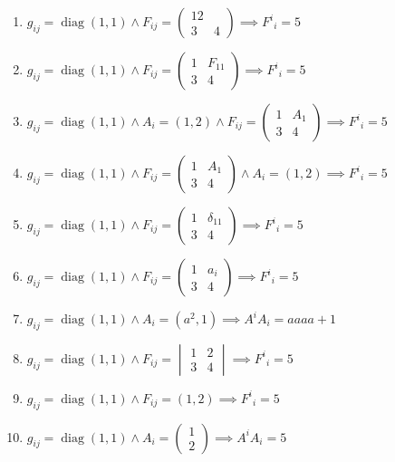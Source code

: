 \documentclass[11pt,a4paper]{article}
\begin{document}
\begin{enumerate}
\item $\displaystyle g_{ij} = \operatorname{diag}(1, 1) \land F_{ij} = \begin{pmatrix} 1 2 \\ 3 & 4 \end{pmatrix} \implies F^{i}{}_{i} = 5$
\item $\displaystyle g_{ij} = \operatorname{diag}(1, 1) \land F_{ij} = \begin{pmatrix} 1 & F_{11} \\ 3 & 4 \end{pmatrix} \implies F^{i}{}_{i} = 5$
\item $\displaystyle g_{ij} = \operatorname{diag}(1, 1) \land A_{i} = (1, 2) \land F_{ij} = \begin{pmatrix} 1 & A_{1} \\ 3 & 4 \end{pmatrix} \implies F^{i}{}_{i} = 5$
\item $\displaystyle g_{ij} = \operatorname{diag}(1, 1) \land F_{ij} = \begin{pmatrix} 1 & A_{1} \\ 3 & 4 \end{pmatrix} \land A_{i} = (1, 2) \implies F^{i}{}_{i} = 5$
\item $\displaystyle g_{ij} = \operatorname{diag}(1, 1) \land F_{ij} = \begin{pmatrix} 1 & \delta_{11} \\ 3 & 4 \end{pmatrix} \implies F^{i}{}_{i} = 5$
\item $\displaystyle g_{ij} = \operatorname{diag}(1, 1) \land F_{ij} = \begin{pmatrix} 1 & a_{i} \\ 3 & 4 \end{pmatrix} \implies F^{i}{}_{i} = 5$
\item $\displaystyle g_{ij} = \operatorname{diag}(1, 1) \land A_{i} = (a^{2}, 1) \implies A^{i} A_{i} = a a a a + 1$
\item $\displaystyle g_{ij} = \operatorname{diag}(1, 1) \land F_{ij} = \begin{vmatrix} 1 & 2 \\ 3 & 4 \end{vmatrix} \implies F^{i}{}_{i} = 5$
\item $\displaystyle g_{ij} = \operatorname{diag}(1, 1) \land F_{ij} = (1, 2) \implies F^{i}{}_{i} = 5$
\item $\displaystyle g_{ij} = \operatorname{diag}(1, 1) \land A_{i} = \begin{pmatrix} 1 \\ 2 \end{pmatrix} \implies A^{i} A_{i} = 5$

\end{enumerate}
\end{document}
